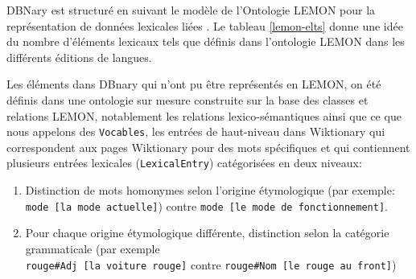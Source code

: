 \documentclass[10pt,a4paper,twoside]{article}
\begin{document}
DBNary est structuré en suivant le modèle de l'Ontologie LEMON pour la représentation de données lexicales liées \cite{DBLP:conf/esws/McCraeSC11}. Le tableau \ref{lemon-elts} donne une idée du nombre d'éléments lexicaux tels que définis dans l'ontologie LEMON dans les différents éditions de langues.

Les éléments dans DBnary qui n'ont pu être représentés en LEMON, on été définis dans une ontologie sur mesure construite sur la base des classes et relations LEMON, notablement les relations lexico-sémantiques ainsi que ce que nous appelons des \verb|Vocables|, les entrées de haut-niveau dans Wiktionary qui correspondent aux pages Wiktionary pour des mots spécifiques et qui contiennent plusieurs entrées lexicales (\verb|LexicalEntry|) catégorisées en deux niveaux:
\begin{enumerate}
	\item Distinction de mots homonymes selon l'origine étymologique (par exemple: \verb|mode [la mode actuelle]|) contre \verb|mode [le mode de fonctionnement]|.
	\item Pour chaque origine étymologique différente, distinction selon la catégorie grammaticale (par exemple \\ \verb|rouge#Adj [la voiture rouge]| contre \verb|rouge#Nom [le rouge au front]|)
\end{enumerate}
\end{document}
